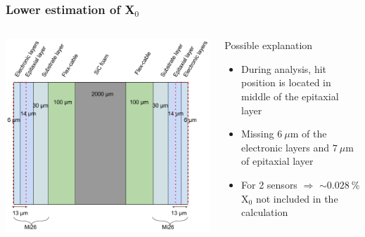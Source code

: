 \documentclass{beamer}
\begin{document}
  \begin{frame}
    \frametitle{Lower estimation of X$_0$}

    \begin{columns}[c]
      \begin{column}{5cm}
        \begin{center}
          \includegraphics[width = 1.2\textwidth]{Pictures/SignalReconstructionMi26.png}
        \end{center}
      \end{column}
      
      \begin{column}{4.5cm}
        \begin{block}{Possible explanation}
          \begin{itemize}
            \item During analysis, hit position is located in middle of the epitaxial layer
            \item Missing $6~\mu$m of the electronic layers and $7~\mu$m of epitaxial layer
            \item For 2 sensors $\Rightarrow$ $ \sim 0.028~\%$ X$_0$ not included in the calculation
          \end{itemize}
        \end{block}
      \end{column}
    \end{columns}

  \end{frame}
\end{document}

